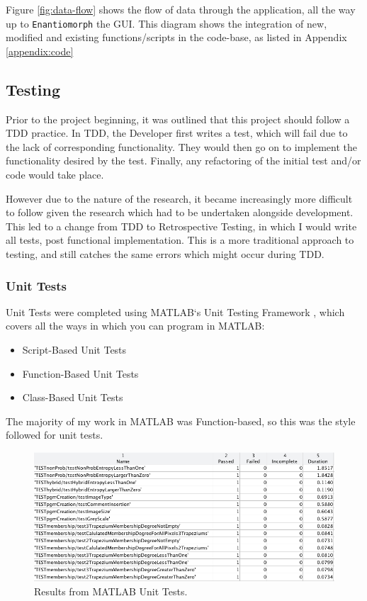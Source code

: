 Figure \ref{fig:data-flow} shows the flow of data through the application, all the way up to \texttt{Enantiomorph} the \acrshort{GUI}. This diagram shows the integration of new, modified and existing functions/scripts in the code-base, as listed in Appendix \ref{appendix:code}

\subsection{Testing}

Prior to the project beginning, it was outlined that this project should follow a \acrshort{TDD} practice. In \acrshort{TDD}, the Developer first writes a test, which will fail due to the lack of corresponding functionality. They would then go on to implement the functionality desired by the test. Finally, any refactoring of the initial test and/or code would take place.

However due to the nature of the research, it became increasingly more difficult to follow given the research which had to be undertaken alongside development. This led to a change from \acrshort{TDD} to Retrospective Testing, in which I would write all tests, post functional implementation. This is a more traditional approach to testing, and still catches the same errors which might occur during \acrshort{TDD}.

\subsubsection{Unit Tests}

Unit Tests were completed using MATLAB`s Unit Testing Framework \cite{testing}, which covers all the ways in which you can program in MATLAB:

\begin{itemize}
  \item Script-Based Unit Tests
  \item Function-Based Unit Tests
  \item Class-Based Unit Tests
  \end{itemize}

The majority of my work in MATLAB was Function-based, so this was the style followed for unit tests.

\begin{figure}[H]
  \centering
  \includegraphics[width=\textwidth]{Chapter2/software-img/test-results.png}
  \caption{Results from MATLAB Unit Tests.}
  \label{fig:unit-test-results}
\end{figure}

